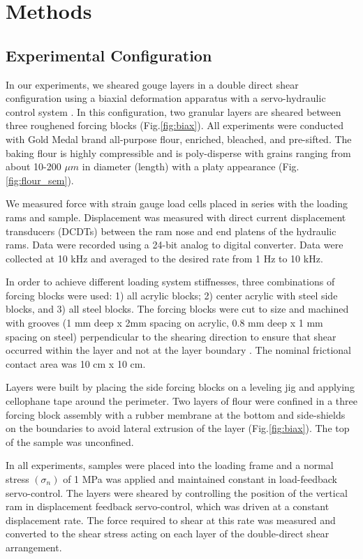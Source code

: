 \section{Methods}

\subsection{Experimental Configuration}

In our experiments, we sheared gouge layers in a double direct shear
configuration using a biaxial deformation apparatus with a servo-hydraulic
control system \cite{Karner:2000tj,Frye:2002jj}.  In this configuration, two
granular layers are sheared between three roughened forcing blocks
(Fig.\ref{fig:biax}).  All experiments were conducted with Gold Medal brand
all-purpose flour, enriched, bleached, and pre-sifted.  The baking flour is
highly compressible and is poly-disperse with grains ranging from about 10-200
$\mu m$ in diameter (length) with a platy appearance (Fig.\ref{fig:flour_sem}).

We measured force with strain gauge load cells placed in series with the loading
rams and sample.  Displacement was measured with direct current displacement
transducers (DCDTs) between the ram nose and end platens of the hydraulic rams.
Data were recorded using a 24-bit analog to digital converter.  Data were
collected at 10 kHz and averaged to the desired rate from 1 Hz to 10 kHz.

In order to achieve different loading system stiffnesses, three combinations of
forcing blocks were used: 1) all acrylic blocks; 2) center acrylic with steel
side blocks, and 3) all steel blocks.  The forcing blocks were cut to size and
machined with grooves (1 mm deep x 2mm spacing on acrylic, 0.8 mm deep x 1 mm
spacing on steel) perpendicular to the shearing direction to ensure that shear
occurred within the layer and not at the layer boundary
\cite{Anthony:2005jo,Knuth:2007ci}. The nominal frictional contact area was 10
cm x 10 cm.

Layers were built by placing the side forcing blocks on a leveling jig and
applying cellophane tape around the perimeter. Two layers of flour were confined
in a three forcing block assembly with a rubber membrane at the bottom and
side-shields on the boundaries to avoid lateral extrusion of the layer
(Fig.\ref{fig:biax}). The top of the sample was unconfined.

In all experiments, samples were placed into the loading frame and a normal
stress $(\sigma_n)$ of 1 MPa was applied and maintained constant in
load-feedback servo-control. The layers were sheared by controlling the position
of the vertical ram in displacement feedback servo-control, which was driven at
a constant displacement rate. The force required to shear at this rate was
measured and converted to the shear stress acting on each layer of the
double-direct shear arrangement.

